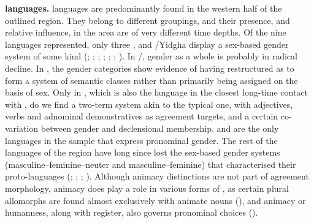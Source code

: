 \documentclass[output=collectionpaper]{langsci/langscibook}
\begin{document}
\textbf{ languages.}  languages are predominantly found in the western half of the outlined region. They belong to different groupings, and their presence, and relative influence, in the area are of very different time depths. Of the nine  languages represented, only three \textendash{} ,  and /Yid\-gha \textendash{} display a sex-based gender system of some kind (\citealt{Bashir2009}; \citealt{Edelman2009b,Edelman2009a}; \citealt{Kieffer2003,Kieffer2009}; \citealt[110--167]{Morgenstierne1938}; \citealt{Robson2009}; \citealt{Skjaervo1989}; \citealt{Windfuhr2009}). In /, gender as a whole is probably in radical decline. In , the gender categories show evidence of having restructured as to form a system of semantic classes rather than primarily being assigned on the basis of sex. Only in , which is also the language in the closest long-time contact with , do we find a two-term system akin to the typical  one, with adjectives, verbs and adnominal demonstratives as agreement targets, and a certain co-variation between gender and declensional membership.  and  are the only  languages in the sample that express pronominal gender. The rest of the  languages of the region have long since lost the sex-based gender systems (masculine--feminine--neuter and masculine--feminine) that characterised their proto-languages (\citealt[71]{Skjaervo2009a}; \citealt[204]{Skjaervo2009b}; \citealt[288]{Yoshida2009}; \citealt[242--243]{Durkin-Meisterernest2009}). Although animacy distinctions are not part of agreement morphology, animacy does play a role in various forms of , as certain plural allomorphs are found almost exclusively with animate nouns (\citealt[431]{Windfuhr2009}), and animacy or humanness, along with register, also governs pronominal choices (\citeyear[435]{Windfuhr2009}).
\end{document}
